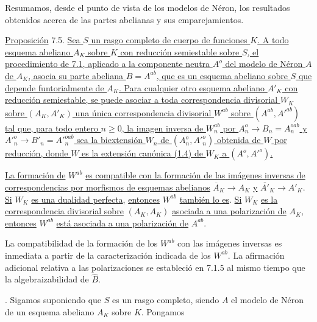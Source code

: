 
Resumamos, desde el punto de vista de los modelos de Néron, los
resultados obtenidos acerca de las partes abelianas y sus
emparejamientos.

\medskip
\noindent
\underline{Proposición} 7.5. \underline{Sea $S$ un rasgo completo de
cuerpo de funciones $K$. A todo esquema abeliano $A_K$ sobre $K$ con
reducción semiestable sobre $S$, el procedimiento de 7.1, aplicado a la
componente neutra $A^o$ del modelo de Néron $A$ de $A_K$, asocia su
parte abeliana $B=A^{ab}$, que es un esquema abeliano sobre $S$ que
depende funtorialmente de $A_K$. Para cualquier otro esquema abeliano
$A'_K$ con reducción semiestable, se puede asociar a toda correspondencia
divisorial $W_K$ sobre $(A_K,A'_K)$ una única correspondencia divisorial
$W^{ab}$ sobre $(A^{ab},{A'}^{ab})$ tal que, para todo entero
$n\geq0$, la imagen inversa de $W_n^{ab}$ por
$A_n^o\longrightarrow B_n=A_n^{oab}$ y
${A'}_n^o\longrightarrow B'_n={A'}_n^{oab}$ sea la biextensión $W_n$
de $(A_n^o,{A'}_n^o)$ obtenida de $W$ por reducción, donde $W$ es la
extensión canónica (1.4) de $W_K$ a $(A^o,{A'}^o)$.}


\underline{La formación de} $W^{ab}$ \underline{es compatible con la formación de
las imágenes inversas de correspondencias por morfismos de esquemas
abelianos} $\overline A_K\longrightarrow A_K$ \underline{y}
$\overline {A'}_K\longrightarrow A'_K$. \underline{Si} $W_K$ \underline{es una dualidad
perfecta}, \underline{entonces} $W^{ab}$ \underline{también lo es}. \underline{Si} $W_K$ \underline{es la correspondencia
divisorial sobre} $(A_K,A_K)$ \underline{asociada a una polarización de} $A_K$,
\underline{entonces} $W^{ab}$ \underline{está asociada a una polarización de} $A^{ab}$.

La compatibilidad de la formación de los $W^{ab}$ con las imágenes
inversas es inmediata a partir de la caracterización indicada de los
$W^{ab}$. La afirmación adicional relativa a las polarizaciones se
estableció en 7.1.5 al mismo tiempo que la algebraizabilidad de
$\widehat B$.

\medskip
{}. Sigamos suponiendo que $S$ es un rasgo completo, siendo $A$ el
modelo de Néron de un esquema abeliano $A_K$ sobre $K$. Pongamos

